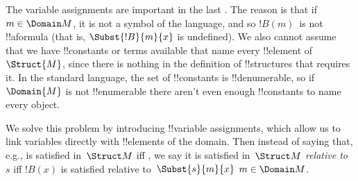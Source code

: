 \documentclass[../../../include/open-logic-section]{subfiles}
\begin{document}
\begin{explain}
The variable assignments are important in the last
. The reason is that if $m \in
\Domain M$, it is not a symbol of the language, and so $!B(m)$~is not
!!a{formula} (that is, $\Subst{!B}{m}{x}$ is undefined).  We also
cannot assume that we have !!{constant}s or terms available that name
every !!{element} of~$\Struct{M}$, since there is nothing in the
definition of !!{structure}s that requires it.  In the standard
language, the set of !!{constant}s is !!{denumerable}, so if
$\Domain{M}$ is not !!{enumerable} there aren't even enough
!!{constant}s to name every object. 

We solve this problem by introducing !!{variable} assignments, which
allow us to link variables directly with !!{element}s of the domain.
Then instead of saying that, e.g.,
 is satisfied
in~$\Struct M$ iff , we say it
is satisfied in~$\Struct M$ \emph{relative to}~$s$ iff $!B(x)$ is
satisfied relative to~$\Subst{s}{m}{x}$  $m \in \Domain M$.
\end{explain}
\end{document}
